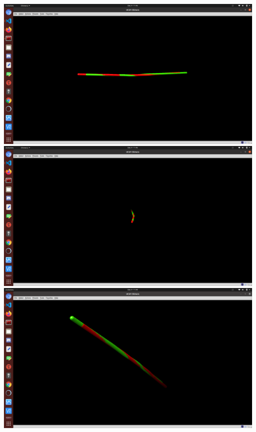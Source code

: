 \documentclass[12pt]{article}
\begin{document}
\includegraphics[trim=0 20 10 50, clip,width=\textwidth] {SideView1.png}
\includegraphics[trim=0 20 10 50, clip,width=\textwidth] {Front.png}
\includegraphics[trim=0 20 10 50, clip,width=\textwidth] {TopDiagonal.png}
\end{document}
